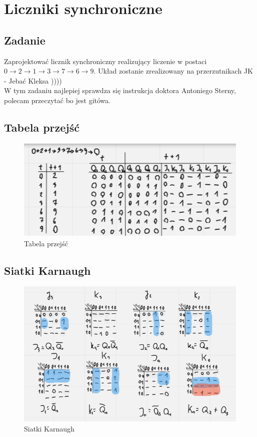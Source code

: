 \section{Liczniki synchroniczne}

\subsection{Zadanie}

Zaprojektować licznik synchroniczny realizujący liczenie w postaci $0 \rightarrow
2 \rightarrow 1 \rightarrow 3 \rightarrow 7 \rightarrow 6 \rightarrow 9$. Układ zostanie zrealizowany na przerzutnikach JK - Jebać Kleksa ))))
\\
W tym zadaniu najlepiej sprawdza się instrukcja doktora Antoniego Sterny, polecam przeczytać bo jest gitówa. 

\subsection{Tabela przejść}

\begin{figure}[h!]
    \centering
    \includegraphics[width = 12cm]{images/sync/sync_t.png}
    \caption{Tabela przejść}
    \label{fig:my_label}
\end{figure}

\subsection{Siatki Karnaugh}

\begin{figure}[h!]
    \centering
    \includegraphics[width = 12cm]{images/sync/sync_k.png}
    \caption{Siatki Karnaugh}
    \label{fig:my_label}
\end{figure}

